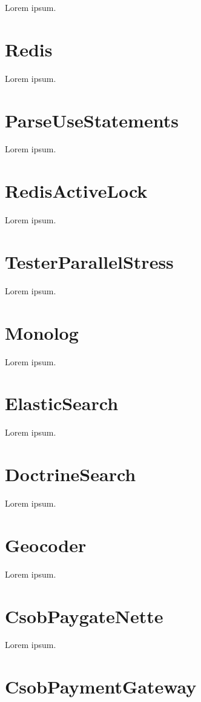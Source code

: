 Lorem ipsum.

\section{Redis}

Lorem ipsum.

\section{ParseUseStatements}

Lorem ipsum.

\section{RedisActiveLock}

Lorem ipsum.

\section{TesterParallelStress}

Lorem ipsum.

\section{Monolog}

Lorem ipsum.

\section{ElasticSearch}

Lorem ipsum.

\section{DoctrineSearch}

Lorem ipsum.

\section{Geocoder}

Lorem ipsum.

\section{CsobPaygateNette}

Lorem ipsum.

\section{CsobPaymentGateway}

